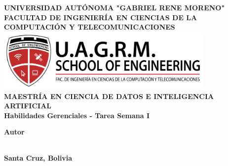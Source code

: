 \begin{titlepage}
    \begin{center}
        {\fontsize{15pt}{10pt}\selectfont\textbf{UNIVERSIDAD AUTÓNOMA "GABRIEL RENE MORENO"}} \\
        {\fontsize{15pt}{10pt}\selectfont\textbf{FACULTAD DE INGENIERÍA EN CIENCIAS DE LA COMPUTACIÓN Y TELECOMUNICACIONES}} \\
        \vspace{1cm}
        \includegraphics[width=0.8\textwidth]{images/logo_soe.png} \\
        
        {\fontsize{15pt}{10pt}\selectfont\textbf{MAESTRÍA EN CIENCIA DE DATOS E INTELIGENCIA ARTIFICIAL}} \\

        \vspace{1cm}
        {\fontsize{15pt}{5pt}\selectfont\textbf{Habilidades Gerenciales - Tarea Semana I}} \\
        \vspace{1cm}
        
        \vspace{2cm}
        \begin{flushright}
        {\fontsize{14pt}{22pt}\selectfont\textbf{Autor}} \\
        {\fontsize{14pt}{22pt}\selectfont{Ing. Darlyn Bravo Peña}} \\
        \end{flushright}
        
        
        
        \vfill
        \textbf{Santa Cruz, Bolivia} \\
    \end{center}
    \end{titlepage}
    